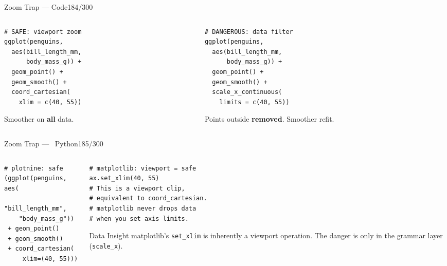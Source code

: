 \documentclass[10pt]{beamer}
\newcommand{\Python}{\textcolor{PyAccent}{\faPython~Python}}
\newcommand{\smark}[1]{\hfill{\scriptsize\color{codegray}#1}}
\begin{document}
\begin{frame}[fragile]{Zoom Trap --- Code}\smark{184/300}
\begin{columns}[T]
\begin{column}{0.48\textwidth}
\begin{lstlisting}[style=Rstyle]
# SAFE: viewport zoom
ggplot(penguins,
  aes(bill_length_mm,
      body_mass_g)) +
  geom_point() +
  geom_smooth() +
  coord_cartesian(
    xlim = c(40, 55))
\end{lstlisting}
\scriptsize Smoother on \textbf{all} data.
\end{column}
\begin{column}{0.48\textwidth}
\begin{lstlisting}[style=Rstyle]
# DANGEROUS: data filter
ggplot(penguins,
  aes(bill_length_mm,
      body_mass_g)) +
  geom_point() +
  geom_smooth() +
  scale_x_continuous(
    limits = c(40, 55))
\end{lstlisting}
\scriptsize Points outside \textbf{removed}. Smoother refit.
\end{column}
\end{columns}
\end{frame}

\begin{frame}[fragile]{Zoom Trap --- \Python}\smark{185/300}
\begin{columns}[T]
\begin{column}{0.48\textwidth}
\begin{lstlisting}[style=Pystyle]
# plotnine: safe
(ggplot(penguins, aes(
    "bill_length_mm",
    "body_mass_g"))
 + geom_point()
 + geom_smooth()
 + coord_cartesian(
     xlim=(40, 55)))
\end{lstlisting}
\end{column}
\begin{column}{0.48\textwidth}
\begin{lstlisting}[style=Pystyle]
# matplotlib: viewport = safe
ax.set_xlim(40, 55)
# This is a viewport clip,
# equivalent to coord_cartesian.
# matplotlib never drops data
# when you set axis limits.
\end{lstlisting}
\vspace{0.2cm}
\begin{exampleblock}{Data Insight}
    \scriptsize matplotlib's \texttt{set\_xlim} is inherently a viewport operation. The danger is only in the grammar layer (\texttt{scale\_x}).
\end{exampleblock}
\end{column}
\end{columns}
\end{frame}
\end{document}
